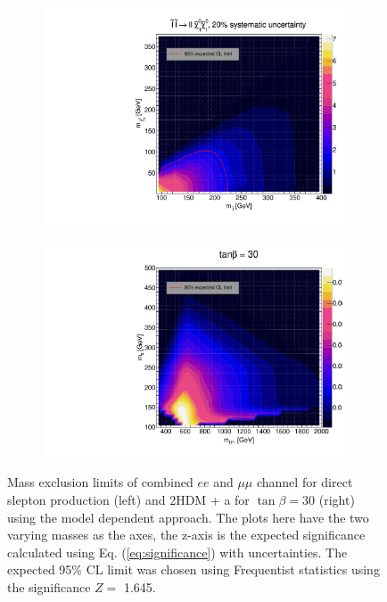 \documentclass[12pt, a4paper]{book}
\begin{document}
\begin{figure}[!ht]
	\centering
	\begin{subfigure}[b]{0.49\textwidth}
      \centering
      \includegraphics[width=1\textwidth]{Limits/SlepSlep/SlepSlep_ll.pdf}
   \end{subfigure}
   \hfill
   \begin{subfigure}[b]{0.49\textwidth}
      \centering
      \includegraphics[width=1\textwidth]{Limits/2HDM/2HDM_ll_tb30.pdf}
   \end{subfigure}
   \caption[Mass exclusion limits of combined $ee$ and $\mu\mu$ channel for direct slepton production and 2HDM + a using the model dependent approach]{
      Mass exclusion limits of combined $ee$ and $\mu\mu$ channel for direct slepton production (left) and 2HDM + a for $\tan\beta=30$ (right) using the model dependent approach. The plots here have the two varying masses as the axes, the z-axis is the expected significance calculated using Eq. (\ref{eq:significance}) with uncertainties. The expected 95\% CL limit was chosen using Frequentist statistics using the significance $Z=$ 1.645.   
}
\end{figure}
\end{document}
